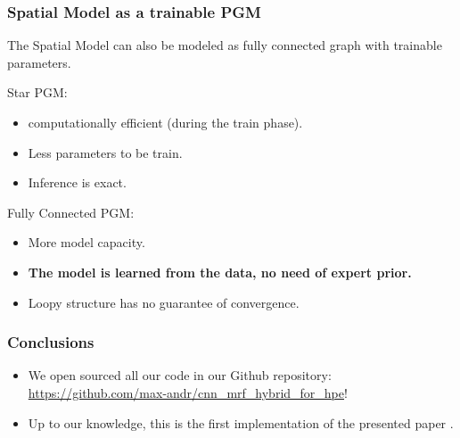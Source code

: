 \documentclass{beamer}
\begin{document}
	\begin{frame}[t]
        \frametitle{Spatial Model as a trainable PGM}
        \begin{center}
            The Spatial Model can also be modeled as fully connected graph with trainable parameters.\newline \newline

        \end{center}

        \begin{flushleft}
            Star PGM:\\
            \begin{itemize}
                \item computationally efficient (during the train phase).\\
                \item Less parameters to be train.\\
                \item Inference is exact.\\
            \end{itemize}
            Fully Connected PGM:\\
            \begin{itemize}
                \item More model capacity.\\
                \item \textbf{The model is learned from the data, no need of expert prior.}\\
                \item Loopy structure has no guarantee of convergence.
            \end{itemize}
        \end{flushleft}
    \end{frame}



    \begin{frame}[t]
        \frametitle{Conclusions}
        \begin{itemize}
            \item We open sourced all our code in our Github repository: \url{https://github.com/max-andr/cnn_mrf_hybrid_for_hpe}! \\
            \item Up to our knowledge, this is the first implementation of the presented paper \cite{cnn_pgm_for_hpe}.
        \end{itemize}
    \end{frame}
\end{document}
